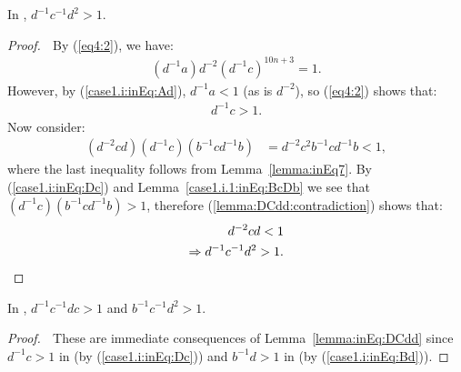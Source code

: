 \begin{lemma} In , $d^{-1}c^{-1}d^{2}>1$.\label{lemma:inEq:DCdd}
\end{lemma}
\begin{proof} $\;$ By (\ref{eq4:2}), we have:
\begin{align*}
(d^{-1}a)d^{-2}(d^{-1}c)^{10n+3}=1.
\end{align*}
However, by (\ref{case1.i:inEq:Ad}), $d^{-1}a<1$ (as is $d^{-2}$), so (\ref{eq4:2}) shows that:
\begin{align}
d^{-1}c>1.\label{case1.i:inEq:Dc}
\end{align}
Now consider:
\begin{align}
(d^{-2}cd)(d^{-1}c)(b^{-1}cd^{-1}b)&=d^{-2}c^{2}b^{-1}cd^{-1}b<1,\label{lemma:DCdd:contradiction}
\end{align}
where the last inequality follows from Lemma~\ref{lemma:inEq7}. By (\ref{case1.i:inEq:Dc}) and Lemma~\ref{case1.i.1:inEq:BcDb} we see that $(d^{-1}c)(b^{-1}cd^{-1}b)>1$, therefore (\ref{lemma:DCdd:contradiction}) shows that:
\begin{align*}
d^{-2}cd<1\\
\Rightarrow{}d^{-1}c^{-1}d^{2}>1.\qedhere
\end{align*}
\end{proof}

\begin{corollary} In , $d^{-1}c^{-1}dc>1$ and $b^{-1}c^{-1}d^{2}>1$.\label{corollary:inEq:DCdd}
\end{corollary}
\begin{proof} $\;$ These are immediate consequences of Lemma~\ref{lemma:inEq:DCdd} since $d^{-1}c>1$ in  (by (\ref{case1.i:inEq:Dc})) and $b^{-1}d>1$ in  (by (\ref{case1.i:inEq:Bd})).
\end{proof}


